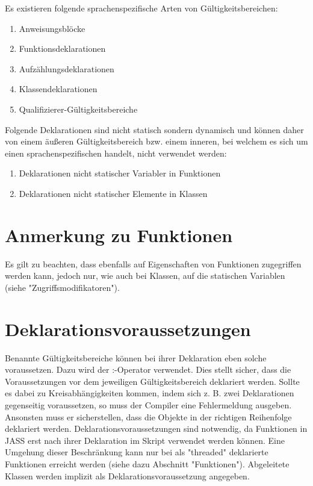 Es existieren folgende sprachenspezifische Arten von Gültigkeitsbereichen:
\begin{enumerate}
\item Anweisungsblöcke
\item Funktionsdeklarationen
\item Aufzählungsdeklarationen
\item Klassendeklarationen
\item Qualifizierer-Gültigkeitsbereiche
\end{enumerate}

Folgende Deklarationen sind nicht statisch sondern dynamisch und können daher von einem äußeren Gültigkeitsbereich bzw. einem inneren, bei welchem es sich um einen
sprachenspezifischen handelt, nicht verwendet werden:
\begin{enumerate}
\item Deklarationen nicht statischer Variabler in Funktionen
\item Deklarationen nicht statischer Elemente in Klassen
\end{enumerate}

\section{Anmerkung zu Funktionen}
Es gilt zu beachten, dass ebenfalls auf Eigenschaften von Funktionen zugegriffen werden kann, jedoch nur, wie auch bei Klassen,
auf die statischen Variablen (siehe "Zugriffsmodifikatoren").

\section{Deklarationsvoraussetzungen}
Benannte Gültigkeitsbereiche können bei ihrer Deklaration eben solche voraussetzen.
Dazu wird der :-Operator verwendet. Dies stellt sicher, dass die Voraussetzungen vor dem jeweiligen
Gültigkeitsbereich deklariert werden. Sollte es dabei zu Kreisabhängigkeiten kommen, indem sich z. B. zwei
Deklarationen gegenseitig voraussetzen, so muss der Compiler eine Fehlermeldung ausgeben.
Ansonsten muss er sicherstellen, dass die Objekte in der richtigen Reihenfolge deklariert werden.
Deklarationsvoraussetzungen sind notwendig, da Funktionen in JASS erst nach ihrer Deklaration im Skript
verwendet werden können.
Eine Umgehung dieser Beschränkung kann nur bei als "threaded" deklarierte Funktionen erreicht werden
(siehe dazu Abschnitt "Funktionen").
Abgeleitete Klassen werden implizit als Deklarationsvoraussetzung angegeben.

